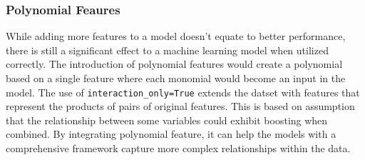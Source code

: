 \subsubsection{Polynomial Feaures}

While adding more features to a model doesn't equate to better performance, there is still a significant effect to a machine learning model when utilized correctly. The introduction of polynomial features would create a polynomial based on a single feature where each monomial would become an input in the model. The use of \texttt{interaction\_only=True} extends the datset with features that represent the products of pairs of original features. This is based on assumption that the relationship between some variables could exhibit boosting when combined. By integrating polynomial feature, it can help the models with a comprehensive framework capture more complex relationships within the data.

